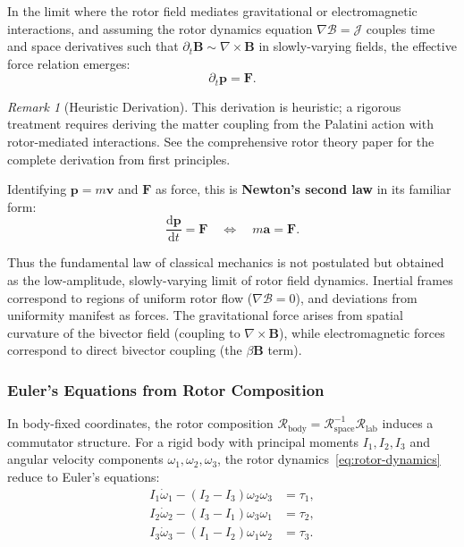 \documentclass[11pt,a4paper]{article}
\newcommand{\Rotor}{\mathcal{R}}
\newcommand{\Biv}{\mathcal{B}}
\newcommand{\D}{\nabla}                        %
\theoremstyle{definition}
\theoremstyle{plain}
\theoremstyle{remark}
\newtheorem{remark}{Remark}
\begin{document}
In the limit where the rotor field mediates gravitational or electromagnetic interactions, and assuming the rotor dynamics equation $\D\Biv = \mathcal{J}$ couples time and space derivatives such that $\partial_t \mathbf{B} \sim \nabla \times \mathbf{B}$ in slowly-varying fields, the effective force relation emerges:
\begin{equation}
\partial_t \mathbf{p} = \mathbf{F}.
\label{eq:newton-translational}
\end{equation}

\begin{remark}[Heuristic Derivation]
This derivation is heuristic; a rigorous treatment requires deriving the matter coupling from the Palatini action with rotor-mediated interactions. See the comprehensive rotor theory paper for the complete derivation from first principles.
\end{remark}

Identifying $\mathbf{p} = m\mathbf{v}$ and $\mathbf{F}$ as force, this is \textbf{Newton's second law} in its familiar form:
\begin{equation}
\boxed{\frac{\mathrm{d}\mathbf{p}}{\mathrm{d}t} = \mathbf{F} \quad \Longleftrightarrow \quad m\mathbf{a} = \mathbf{F}.}
\label{eq:newton-final}
\end{equation}

Thus the fundamental law of classical mechanics is not postulated but obtained as the low-amplitude, slowly-varying limit of rotor field dynamics. Inertial frames correspond to regions of uniform rotor flow ($\D\Biv = 0$), and deviations from uniformity manifest as forces. The gravitational force arises from spatial curvature of the bivector field (coupling to $\nabla \times \mathbf{B}$), while electromagnetic forces correspond to direct bivector coupling (the $\beta\mathbf{B}$ term).

\subsubsection{Euler's Equations from Rotor Composition}

In body-fixed coordinates, the rotor composition $\Rotor_{\text{body}} = \Rotor_{\text{space}}^{-1} \Rotor_{\text{lab}}$ induces a commutator structure. For a rigid body with principal moments $I_1, I_2, I_3$ and angular velocity components $\omega_1, \omega_2, \omega_3$, the rotor dynamics~\eqref{eq:rotor-dynamics} reduce to Euler's equations:
\begin{align}
I_1 \dot{\omega}_1 - (I_2 - I_3)\omega_2\omega_3 &= \tau_1, \\
I_2 \dot{\omega}_2 - (I_3 - I_1)\omega_3\omega_1 &= \tau_2, \\
I_3 \dot{\omega}_3 - (I_1 - I_2)\omega_1\omega_2 &= \tau_3.
\end{align}
\end{document}

